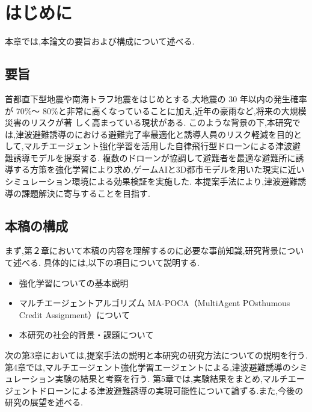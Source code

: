 \chapter{はじめに}
本章では,本論文の要旨および構成について述べる.
\section{要旨}
首都直下型地震や南海トラフ地震をはじめとする,大地震の 30 年以内の発生確率が 70\%～
80\%と非常に高くなっていることに加え,近年の豪雨など,将来の大規模災害のリスクが著
しく高まっている現状がある.
このような背景の下,本研究では,津波避難誘導のにおける避難完了率最適化と誘導人員のリスク軽減を目的として,マルチエージェント強化学習を活用した自律飛行型ドローンによる津波避難誘導モデルを提案する.
複数のドローンが協調して避難者を最適な避難所に誘導する方策を強化学習により求め,ゲームAIと3D都市モデルを用いた現実に近いシミュレーション環境による効果検証を実施した.
本提案手法により,津波避難誘導の課題解決に寄与することを目指す.

\section{本稿の構成}
まず,第２章において本稿の内容を理解するのに必要な事前知識,研究背景について述べる.
具体的には,以下の項目について説明する.
\begin{itemize}
  \item 強化学習についての基本説明
  \item マルチエージェントアルゴリズム MA-POCA（MultiAgent POsthumous Credit Assignment）について
  \item 本研究の社会的背景・課題について
\end{itemize}

次の第3章においては,提案手法の説明と本研究の研究方法についての説明を行う.
第4章では,マルチエージェント強化学習エージェントによる,津波避難誘導のシミュレーション実験の結果と考察を行う.
第5章では,実験結果をまとめ,マルチエージェントドローンによる津波避難誘導の実現可能性について論ずる.また,今後の研究の展望を述べる.
